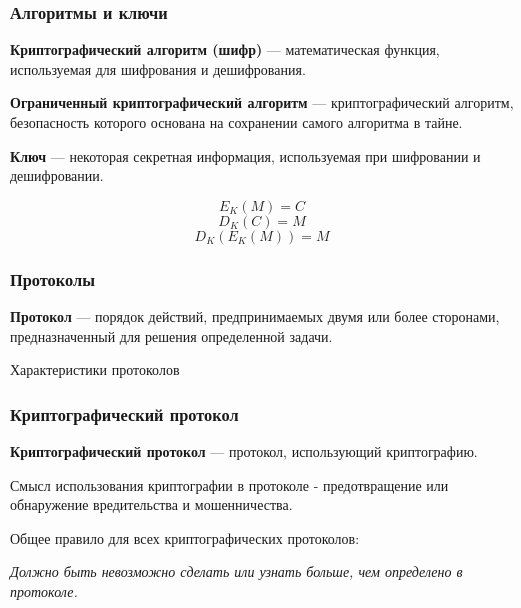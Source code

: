 \documentclass{beamer}
\newcommand{\define}[2]{{\bf #1} --- #2.\vspace{1em}}
\begin{document}
\begin{frame}
  \frametitle{Алгоритмы и ключи}

  \define{Криптографический алгоритм (шифр)} {математическая функция, используемая для шифрования и дешифрования}

  \define{Ограниченный криптографический алгоритм} {криптографический алгоритм, безопасность которого основана на сохранении самого алгоритма в тайне}

  \define{Ключ} {некоторая секретная информация, используемая при шифровании и дешифровании}
  

  \[E_{K}(M)=C\]
  \[D_{K}(C)=M\]
  \[D_{K}(E_{K}(M))=M\]

\end{frame}


\begin{frame}[shrink]
  \frametitle{Протоколы}

  \define{Протокол} {порядок действий, предпринимаемых двумя или более сторонами, предназначенный для решения определенной задачи}

\begin{block}{Характеристики протоколов}
\end{block}

\end{frame}

\begin{frame}
  \frametitle{Криптографический протокол}

  \define{Криптографический протокол} {протокол, использующий криптографию}

  Смысл использования криптографии в протоколе - предотвращение или обнаружение вредительства и мошенничества.

  \vspace{1\baselineskip}
  Общее правило для всех криптографических протоколов:
  \vspace{0.5em}
  
  \textit{Должно быть невозможно сделать или узнать больше, чем определено в протоколе.}

\end{frame}
\end{document}
